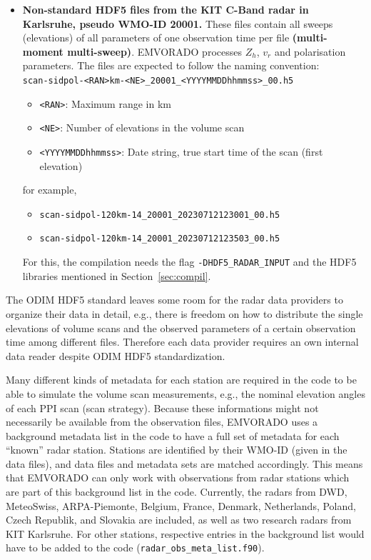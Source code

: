 \documentclass[10pt,a4paper,twoside,headinclude,footinclude,parskip=half]{scrartcl}
\newcommand{\srcform}[1]{\mbox{\texttt{#1}}\xspace}%
\begin{document}
\begin{itemize}
\item \textbf{Non-standard HDF5 files from the KIT C-Band radar in Karlsruhe, pseudo WMO-ID 20001.}
  These files contain all sweeps (elevations) of all parameters of one observation time per file \textbf{(multi-moment multi-sweep)}.
  EMVORADO processes $Z_h$, $v_r$ and polarisation parameters. The files are expected to follow the naming convention:\\[0.5em]
  \verb$scan-sidpol-<RAN>km-<NE>_20001_<YYYYMMDDhhmmss>_00.h5$
  \begin{itemize}
  \item \verb|<RAN>|: Maximum range in km
  \item \verb|<NE>|: Number of elevations in the volume scan
  \item \verb|<YYYYMMDDhhmmss>|: Date string, true start time of the scan (first elevation)
  \end{itemize}
  for example,
  \begin{itemize}
  \item \verb|scan-sidpol-120km-14_20001_20230712123001_00.h5|
  \item \verb|scan-sidpol-120km-14_20001_20230712123503_00.h5|
  \end{itemize}
  For this, the compilation needs the flag \srcform{-DHDF5_RADAR_INPUT} and the HDF5 libraries mentioned in Section~\ref{sec:compil}.
  
  
\end{itemize}
The ODIM HDF5 standard leaves some room for the radar data providers to organize
their data in detail, e.g., there is freedom on how to distribute the single
elevations of volume scans and the observed parameters of a certain observation time among different files.
Therefore each data provider requires an own internal data reader despite
ODIM HDF5 standardization.

Many different kinds of metadata for each station are required in the code to be able to simulate the
volume scan measurements, e.g., the nominal elevation angles of each PPI scan (scan strategy). Because these
informations might not necessarily be available from the observation files, EMVORADO uses a background metadata list in the code
to have a full set of metadata for each ``known'' radar station. Stations are identified by their WMO-ID (given in the data files), and data
files and metadata sets are matched accordingly. This means that EMVORADO can only work with observations from
radar stations which are part of this background list in the code. Currently, the radars from DWD, MeteoSwiss, ARPA-Piemonte, Belgium, France, Denmark, Netherlands, Poland, Czech Republik, and Slovakia
are included, as well as two research radars from KIT Karlsruhe. For other stations, respective entries in the background list would have to be added to the code (\srcform{radar_obs_meta_list.f90}).
\end{document}
